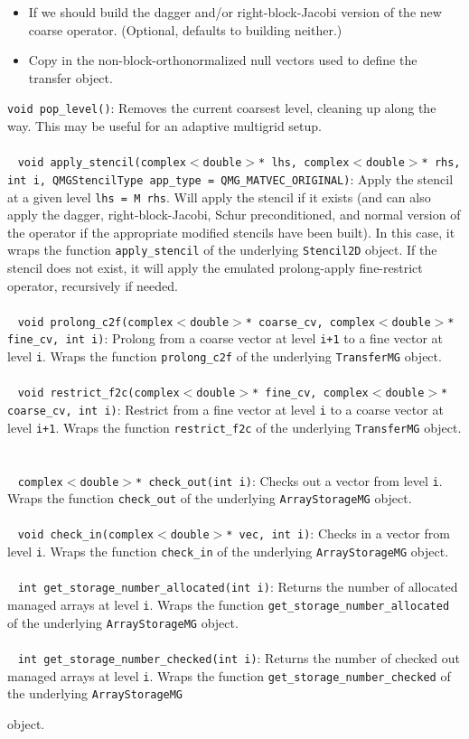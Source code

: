 \documentclass[pdftex,letterpaper,10pt]{article}
\begin{document}
{{{{{\begin{itemize}
\item If we should build the dagger and/or right-block-Jacobi version of the new coarse operator. (Optional, defaults to building neither.)
\item Copy in the non-block-orthonormalized null vectors used to define the transfer object.
\end{itemize}
{\texttt{void pop\_level()}: Removes the current coarsest level, cleaning up along the way. This may be useful for an adaptive multigrid setup.
~\\~\\~
{\texttt{void apply\_stencil(complex$<$double$>$* lhs, complex$<$double$>$* rhs, int i, QMGStencilType app\_type = QMG\_MATVEC\_ORIGINAL)}}: Apply the stencil at a given level \texttt{lhs = M rhs}. Will apply the stencil if it exists (and can also apply the dagger, right-block-Jacobi, Schur preconditioned, and normal version of the operator if the appropriate modified stencils have been built). In this case, it wraps the function {\texttt{apply\_stencil}} of the underlying \texttt{Stencil2D} object. If the stencil does not exist, it will apply the emulated prolong-apply fine-restrict operator, recursively if needed.
~\\~\\~
{\texttt{void prolong\_c2f(complex$<$double$>$* coarse\_cv, complex$<$double$>$* fine\_cv, int i)}}: Prolong from a coarse vector at level \texttt{i+1} to a fine vector at level \texttt{i}. Wraps the function {\texttt{prolong\_c2f}} of the underlying \texttt{TransferMG} object.
~\\~\\~
{\texttt{void restrict\_f2c(complex$<$double$>$* fine\_cv, complex$<$double$>$* coarse\_cv, int i)}}: Restrict from a fine vector at level \texttt{i} to a coarse vector at level \texttt{i+1}. Wraps the function {\texttt{restrict\_f2c}} of the underlying \texttt{TransferMG} object.
~\\~\\~
{\texttt{complex$<$double$>$* check\_out(int i)}}: Checks out a vector from level \texttt{i}. Wraps the function \texttt{check\_out} of the underlying \texttt{ArrayStorageMG} object.
~\\~\\~
{\texttt{void check\_in(complex$<$double$>$* vec, int i)}}: Checks in a vector from level \texttt{i}. Wraps the function \texttt{check\_in} of the underlying \texttt{ArrayStorageMG} object.
~\\~\\~
{\texttt{int get\_storage\_number\_allocated(int i)}}: Returns the number of allocated managed arrays at level \texttt{i}. Wraps the function \texttt{get\_storage\_number\_allocated} of the underlying \texttt{ArrayStorageMG}} object.
~\\~\\~
{\texttt{int get\_storage\_number\_checked(int i)}}: Returns the number of checked out managed arrays at level \texttt{i}. Wraps the function \texttt{get\_storage\_number\_checked} of the underlying \texttt{ArrayStorageMG}} object.

}}}}
\end{document}
